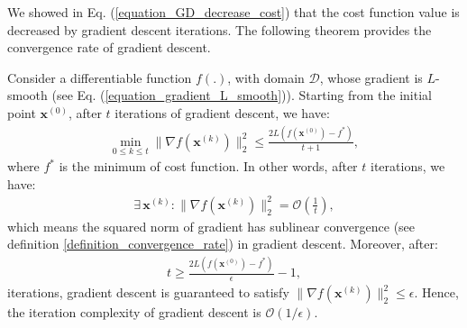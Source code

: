 \documentclass[lang=cn,10pt]{gorgeousnbook}
\numberwithin{equation}{section}%
\numberwithin{figure}{section}%
\begin{document}
We showed in Eq. (\ref{equation_GD_decrease_cost}) that the cost function value is decreased by gradient descent iterations. The following theorem provides the convergence rate of gradient descent. 
\begin{theorem}\label{theorem_GD_convergence_rate}
Consider a differentiable function $f(.)$, with domain $\mathcal{D}$, whose gradient is $L$-smooth (see Eq. (\ref{equation_gradient_L_smooth})).
Starting from the initial point $\boldsymbol{x}^{(0)}$, after $t$ iterations of gradient descent, we have:
\begin{align}\label{equation_GD_upperbound_min_norm_gradient}
\min_{0\leq k \leq t} \|\nabla f(\boldsymbol{x}^{(k)})\|_2^2 \leq \frac{2 L (f(\boldsymbol{x}^{(0)}) - f^*)}{t+1},
\end{align}
where $f^*$ is the minimum of cost function. In other words, after $t$ iterations, we have:
\begin{align}\label{equation_GD_norm_gradient_sublinear_rate}
\exists\, \boldsymbol{x}^{(k)}: \|\nabla f(\boldsymbol{x}^{(k)})\|_2^2 = \mathcal{O}(\frac{1}{t}),
\end{align}
which means the squared norm of gradient has sublinear convergence (see definition \ref{definition_convergence_rate}) in gradient descent. 
Moreover, after:
\begin{align}\label{equation_GD_t_lowerbound_for_convergence}
t \geq \frac{2 L (f(\boldsymbol{x}^{(0)}) - f^*)}{\epsilon} - 1,
\end{align}
iterations, gradient descent is guaranteed to satisfy $\|\nabla f(\boldsymbol{x}^{(k)})\|_2^2 \leq \epsilon$. 
Hence, the iteration complexity of gradient descent is $\mathcal{O}(1/\epsilon)$. 
\end{theorem}
\end{document}

